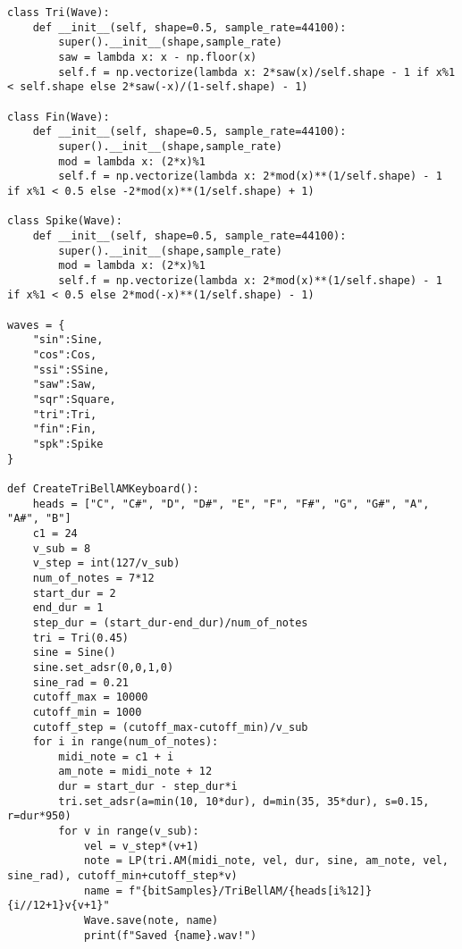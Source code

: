 \documentclass[../main.tex]{subfiles}
\begin{document}
\begin{verbatim}
class Tri(Wave):
    def __init__(self, shape=0.5, sample_rate=44100):
        super().__init__(shape,sample_rate)
        saw = lambda x: x - np.floor(x)
        self.f = np.vectorize(lambda x: 2*saw(x)/self.shape - 1 if x%1 < self.shape else 2*saw(-x)/(1-self.shape) - 1)

class Fin(Wave):
    def __init__(self, shape=0.5, sample_rate=44100):
        super().__init__(shape,sample_rate)
        mod = lambda x: (2*x)%1
        self.f = np.vectorize(lambda x: 2*mod(x)**(1/self.shape) - 1 if x%1 < 0.5 else -2*mod(x)**(1/self.shape) + 1)

class Spike(Wave):
    def __init__(self, shape=0.5, sample_rate=44100):
        super().__init__(shape,sample_rate)
        mod = lambda x: (2*x)%1
        self.f = np.vectorize(lambda x: 2*mod(x)**(1/self.shape) - 1 if x%1 < 0.5 else 2*mod(-x)**(1/self.shape) - 1)

waves = {
    "sin":Sine,
    "cos":Cos,
    "ssi":SSine,
    "saw":Saw,
    "sqr":Square,
    "tri":Tri,
    "fin":Fin,
    "spk":Spike
}

def CreateTriBellAMKeyboard():
    heads = ["C", "C#", "D", "D#", "E", "F", "F#", "G", "G#", "A", "A#", "B"]
    c1 = 24
    v_sub = 8
    v_step = int(127/v_sub)
    num_of_notes = 7*12
    start_dur = 2
    end_dur = 1
    step_dur = (start_dur-end_dur)/num_of_notes
    tri = Tri(0.45)
    sine = Sine()
    sine.set_adsr(0,0,1,0)
    sine_rad = 0.21
    cutoff_max = 10000
    cutoff_min = 1000
    cutoff_step = (cutoff_max-cutoff_min)/v_sub
    for i in range(num_of_notes):
        midi_note = c1 + i
        am_note = midi_note + 12
        dur = start_dur - step_dur*i
        tri.set_adsr(a=min(10, 10*dur), d=min(35, 35*dur), s=0.15, r=dur*950)
        for v in range(v_sub):
            vel = v_step*(v+1)
            note = LP(tri.AM(midi_note, vel, dur, sine, am_note, vel, sine_rad), cutoff_min+cutoff_step*v)
            name = f"{bitSamples}/TriBellAM/{heads[i%12]}{i//12+1}v{v+1}"
            Wave.save(note, name)
            print(f"Saved {name}.wav!")


\end{verbatim}
\end{document}
